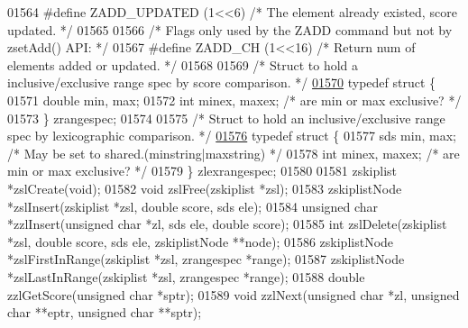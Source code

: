 \begin{DoxyCode}
{{{{{{{01564 \textcolor{preprocessor}{#}\textcolor{preprocessor}{define} \textcolor{preprocessor}{ZADD\_UPDATED} \textcolor{preprocessor}{(}1\textcolor{preprocessor}{<<}6\textcolor{preprocessor}{)} \textcolor{comment}{/* The element already existed, score updated. */}
01565 
01566 \textcolor{comment}{/* Flags only used by the ZADD command but not by zsetAdd() API: */}
01567 \textcolor{preprocessor}{#}\textcolor{preprocessor}{define} \textcolor{preprocessor}{ZADD\_CH} \textcolor{preprocessor}{(}1\textcolor{preprocessor}{<<}16\textcolor{preprocessor}{)}      \textcolor{comment}{/* Return num of elements added or updated. */}
01568 
01569 \textcolor{comment}{/* Struct to hold a inclusive/exclusive range spec by score comparison. */}
\hyperlink{structzrangespec}{01570} \textcolor{keyword}{typedef} \textcolor{keyword}{struct} \{
01571     \textcolor{keywordtype}{double} min, max;
01572     \textcolor{keywordtype}{int} minex, maxex; \textcolor{comment}{/* are min or max exclusive? */}
01573 \} zrangespec;
01574 
01575 \textcolor{comment}{/* Struct to hold an inclusive/exclusive range spec by lexicographic comparison. */}
\hyperlink{structzlexrangespec}{01576} \textcolor{keyword}{typedef} \textcolor{keyword}{struct} \{
01577     sds min, max;     \textcolor{comment}{/* May be set to shared.(minstring|maxstring) */}
01578     \textcolor{keywordtype}{int} minex, maxex; \textcolor{comment}{/* are min or max exclusive? */}
01579 \} zlexrangespec;
01580 
01581 zskiplist *zslCreate(\textcolor{keywordtype}{void});
01582 \textcolor{keywordtype}{void} zslFree(zskiplist *zsl);
01583 zskiplistNode *zslInsert(zskiplist *zsl, \textcolor{keywordtype}{double} score, sds ele);
01584 \textcolor{keywordtype}{unsigned} \textcolor{keywordtype}{char} *zzlInsert(\textcolor{keywordtype}{unsigned} \textcolor{keywordtype}{char} *zl, sds ele, \textcolor{keywordtype}{double} score);
01585 \textcolor{keywordtype}{int} zslDelete(zskiplist *zsl, \textcolor{keywordtype}{double} score, sds ele, zskiplistNode **node);
01586 zskiplistNode *zslFirstInRange(zskiplist *zsl, zrangespec *range);
01587 zskiplistNode *zslLastInRange(zskiplist *zsl, zrangespec *range);
01588 \textcolor{keywordtype}{double} zzlGetScore(\textcolor{keywordtype}{unsigned} \textcolor{keywordtype}{char} *sptr);
01589 \textcolor{keywordtype}{void} zzlNext(\textcolor{keywordtype}{unsigned} \textcolor{keywordtype}{char} *zl, \textcolor{keywordtype}{unsigned} \textcolor{keywordtype}{char} **eptr, \textcolor{keywordtype}{unsigned} \textcolor{keywordtype}{char} **sptr);
}}}}}}}
\end{DoxyCode}
